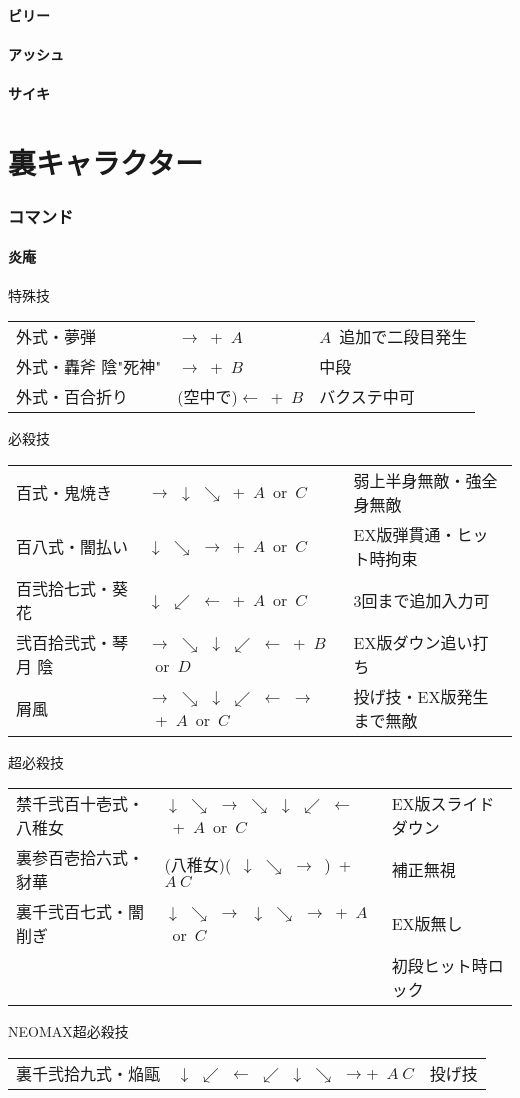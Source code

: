 \documentclass[a4j,11pt]{jarticle}
\def\hado{$\downarrow$ $\searrow$ $\rightarrow$}%
\def\tatsu{$\downarrow$ $\swarrow$ $\leftarrow$}%
\def\syoryu{$\rightarrow$ $\downarrow$ $\searrow$}%
\def\gyakuyoga{$\rightarrow$ $\searrow$ $\downarrow$ $\swarrow$ $\leftarrow$}%
\def\tenti{$\rightarrow$ $\searrow$ $\downarrow$ $\swarrow$ $\leftarrow$ $\rightarrow$}%
\def\ryuko{$\downarrow$ $\searrow$ $\rightarrow$ $\searrow$ $\downarrow$ $\swarrow$ $\leftarrow$}%
\def\orochi{$\downarrow$ $\swarrow$ $\leftarrow$ $\swarrow$ $\downarrow$ $\searrow$ $\rightarrow$}%
\begin{document}
\subsection{ビリー}
\subsection{アッシュ}
\subsection{サイキ}
\newpage
\part{裏キャラクター}%
\section{コマンド}
\subsection{炎庵}
\begin{itembox}[l]{特殊技}
\begin{tabular}{lll}
外式・夢弾&$\rightarrow$\ +\ $A$&$A$\ 追加で二段目発生\\
外式・轟斧 陰"死神"&$\rightarrow$\ +\ $B$&中段\\%
外式・百合折り&(空中で)$\leftarrow$\ +\ $B$&バクステ中可%
\end{tabular}
\end{itembox}
\begin{itembox}[l]{必殺技}
\begin{tabular}{lll}
百式・鬼焼き&\syoryu\ +\ $A$\ or\ $C$&弱上半身無敵・強全身無敵\\%
百八式・闇払い&\hado\ +\ $A$\ or\ $C$&EX版弾貫通・ヒット時拘束\\%
百弐拾七式・葵花&\tatsu\ +\ $A$\ or\ $C$&3回まで追加入力可\\%
弐百拾弐式・琴月 陰&\gyakuyoga\ +\ $B$\ or\ $D$&EX版ダウン追い打ち\\%
屑風&\tenti\ +\ $A$\ or\ $C$&投げ技・EX版発生まで無敵%
\end{tabular}
\end{itembox}
\begin{itembox}[l]{超必殺技}
\begin{tabular}{lll}
禁千弐百十壱式・八稚女&\ryuko\ +\ $A$\ or\ $C$&EX版スライドダウン\\%
裏参百壱拾六式・豺華&(八稚女)(\ \hado\ )\times 4\ +\ $A\ C$&補正無視\\
裏千弐百七式・闇削ぎ&\hado\ \hado\ +\ $A$\ or\ $C$&EX版無し\\
&&初段ヒット時ロック%
\end{tabular}
\end{itembox}
\begin{itembox}[l]{NEOMAX超必殺技}
\begin{tabular}{lll}
裏千弐拾九式・焔甌&\orochi +\ $A\ C$&投げ技%
\end{tabular}
\end{itembox}
\newpage
\end{document}
